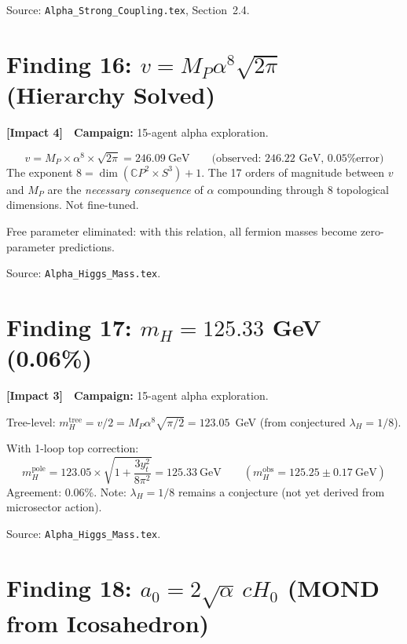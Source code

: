 \documentclass[11pt,a4paper]{article}
\newcommand{\impactfour}{\textcolor{impact4}{\textbf{[Impact 4]}}}
\newcommand{\impactthree}{\textcolor{impact3}{\textbf{[Impact 3]}}}
\newcommand{\CP}{\mathbb{C}P}
\begin{document}
Source: \texttt{Alpha\_Strong\_Coupling.tex}, Section~2.4.


\section{Finding 16: $v = M_P \alpha^8 \sqrt{2\pi}$ (Hierarchy Solved)}
\label{sec:hierarchy}

\impactfour\ \ \textbf{Campaign:} 15-agent alpha exploration.

\begin{equation}
v = M_P \times \alpha^8 \times \sqrt{2\pi} = 246.09~\text{GeV}
\qquad\text{(observed: 246.22 GeV, 0.05\% error)}
\end{equation}
The exponent $8 = \dim(\CP^2 \times S^3) + 1$. The 17 orders of
magnitude between $v$ and $M_P$ are the \emph{necessary consequence}
of $\alpha$ compounding through 8 topological dimensions. Not fine-tuned.

Free parameter eliminated: with this relation, all fermion masses
become zero-parameter predictions.

Source: \texttt{Alpha\_Higgs\_Mass.tex}.


\section{Finding 17: $m_H = 125.33$ GeV (0.06\%)}
\label{sec:Higgs}

\impactthree\ \ \textbf{Campaign:} 15-agent alpha exploration.

Tree-level: $m_H^{\mathrm{tree}} = v/2 = M_P \alpha^8 \sqrt{\pi/2} = 123.05$~GeV
(from conjectured $\lambda_H = 1/8$).

With 1-loop top correction:
\[
m_H^{\mathrm{pole}} = 123.05 \times \sqrt{1 + \frac{3y_t^2}{8\pi^2}}
= 125.33~\text{GeV}
\qquad(m_H^{\mathrm{obs}} = 125.25 \pm 0.17~\text{GeV})
\]
Agreement: 0.06\%. Note: $\lambda_H = 1/8$ remains a conjecture
(not yet derived from microsector action).

Source: \texttt{Alpha\_Higgs\_Mass.tex}.


\section{Finding 18: $a_0 = 2\sqrt{\alpha}\,cH_0$ (MOND from Icosahedron)}
\label{sec:MOND}
\end{document}
